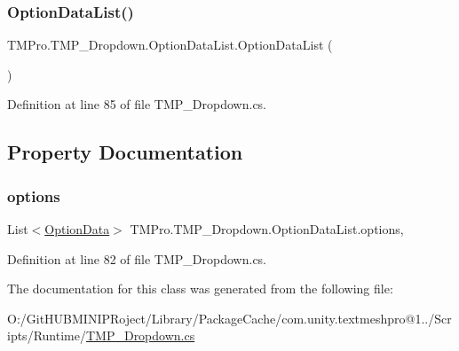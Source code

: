\subsubsection{\texorpdfstring{OptionDataList()}{OptionDataList()}}
{\footnotesize\ttfamily T\+M\+Pro.\+T\+M\+P\+\_\+\+Dropdown.\+Option\+Data\+List.\+Option\+Data\+List (\begin{DoxyParamCaption}{ }\end{DoxyParamCaption})}



Definition at line 85 of file T\+M\+P\+\_\+\+Dropdown.\+cs.



\subsection{Property Documentation}
\mbox{\label{class_t_m_pro_1_1_t_m_p___dropdown_1_1_option_data_list_abdf0739ee1b292c91df8df0a19ea8509}} 
\subsubsection{\texorpdfstring{options}{options}}
{\footnotesize\ttfamily List$<$\mbox{\hyperlink{class_t_m_pro_1_1_t_m_p___dropdown_1_1_option_data}{Option\+Data}}$>$ T\+M\+Pro.\+T\+M\+P\+\_\+\+Dropdown.\+Option\+Data\+List.\+options\hspace{0.3cm}{\ttfamily [get]}, {\ttfamily [set]}}



Definition at line 82 of file T\+M\+P\+\_\+\+Dropdown.\+cs.



The documentation for this class was generated from the following file\+:\begin{DoxyCompactItemize}
\item 
O\+:/\+Git\+H\+U\+B\+M\+I\+N\+I\+P\+Roject/\+Library/\+Package\+Cache/com.\+unity.\+textmeshpro@1../\+Scripts/\+Runtime/\mbox{\hyperlink{_t_m_p___dropdown_8cs}{T\+M\+P\+\_\+\+Dropdown.\+cs}}\end{DoxyCompactItemize}

